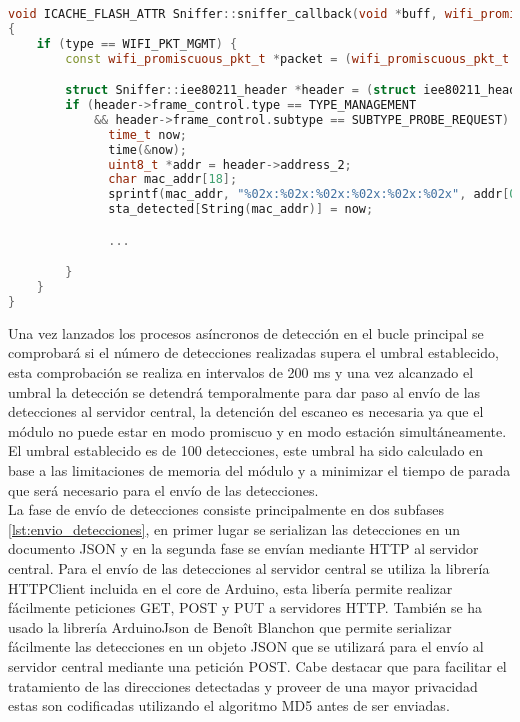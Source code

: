 \documentclass[../proyecto.tex]{subfiles}
\begin{document}
\begin{lstlisting}[language=C++, caption=Función \textit{callback} para el modo promiscuo , captionpos=b, frame=single, label={lst:wifi_callback}]
void ICACHE_FLASH_ATTR Sniffer::sniffer_callback(void *buff, wifi_promiscuous_pkt_type_t type)
{
    if (type == WIFI_PKT_MGMT) {
        const wifi_promiscuous_pkt_t *packet = (wifi_promiscuous_pkt_t *)buff;

        struct Sniffer::iee80211_header *header = (struct iee80211_header*) packet->payload;
        if (header->frame_control.type == TYPE_MANAGEMENT
            && header->frame_control.subtype == SUBTYPE_PROBE_REQUEST) {
              time_t now;
              time(&now);
              uint8_t *addr = header->address_2;
              char mac_addr[18];
              sprintf(mac_addr, "%02x:%02x:%02x:%02x:%02x:%02x", addr[0], addr[1], addr[2], addr[3], addr[4], addr[5]);
              sta_detected[String(mac_addr)] = now;

              ...

        }
    }
}
\end{lstlisting}

Una vez lanzados los procesos asíncronos de detección en el bucle principal se comprobará si el número de detecciones realizadas supera el umbral establecido, esta comprobación se realiza en intervalos de 200 ms y una vez alcanzado el umbral la detección se detendrá temporalmente para dar paso al envío de las detecciones al servidor central, la detención del escaneo es necesaria ya que el módulo no puede estar en modo promiscuo y en modo estación simultáneamente. El umbral establecido es de 100 detecciones, este umbral ha sido calculado en base a las limitaciones de memoria del módulo y a minimizar el tiempo de parada que será necesario para el envío de las detecciones.\\

La fase de envío de detecciones consiste principalmente en dos subfases \autoref{lst:envio_detecciones}, en primer lugar se serializan las detecciones en un documento JSON y en la segunda fase se envían mediante HTTP al servidor central. Para el envío de las detecciones al servidor central se utiliza la librería HTTPClient incluida en el core de Arduino, esta libería permite realizar fácilmente peticiones GET, POST y PUT a servidores HTTP. También se ha usado la librería ArduinoJson de Benoît Blanchon que permite serializar fácilmente las detecciones en un objeto JSON que se utilizará para el envío al servidor central mediante una petición POST. Cabe destacar que para facilitar el tratamiento de las direcciones detectadas y proveer de una mayor privacidad estas son codificadas utilizando el algoritmo MD5 antes de ser enviadas.\\
\end{document}
